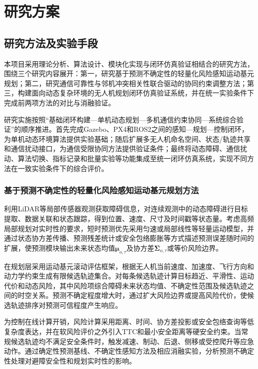 \chapter{研究方案}

\section{研究方法及实验手段}

本项目采用理论分析、算法设计、模块化实现与闭环仿真验证相结合的研究方法，围绕三个研究内容展开：第一，研究基于预测不确定性的轻量化风险感知运动基元规划；第二，研究通信可靠性与邻机冲突相关性联合驱动的协同约束调整方法；第三，构建面向动态复杂环境的无人机规划闭环仿真验证系统，并在统一实验条件下完成前两项方法的对比与消融验证。

研究实施按照“基础闭环构建—单机动态规划—多机通信约束协同—系统综合验证”的顺序推进。首先完成Gazebo、PX4和ROS2之间的感知—规划—控制闭环，为单机动态环境算法提供实验基础；随后扩展多无人机命名空间、状态/轨迹共享和通信扰动接口，为通信受限协同方法提供验证条件；最终将动态障碍、通信扰动、算法切换、指标记录和批量实验等功能集成至统一闭环仿真系统，实现不同方法在一致实验条件下的综合评价。

\subsection{基于预测不确定性的轻量化风险感知运动基元规划方法}

利用LiDAR等局部传感器观测获取障碍信息，对连续观测中的动态障碍进行目标提取、数据关联和状态跟踪，得到位置、速度、尺寸及时间戳等状态量。考虑高频局部规划对实时性的要求，短时预测优先采用匀速或局部线性等轻量运动模型，并通过状态协方差传播、预测残差统计或安全包络膨胀等方式描述预测误差随时间的扩展，使预测模块输出未来状态均值$\boldsymbol{\mu}_{o,\tau}$及协方差$\boldsymbol{\Sigma}_{o,\tau}$或等价风险边界。

在规划层采用运动基元滚动评估框架，根据无人机当前速度、加速度、飞行方向和动力学约束生成有限候选轨迹集合。对每条候选轨迹计算目标趋近、平滑性、运动代价和动态风险，其中风险项综合障碍未来状态均值、不确定性范围及候选轨迹之间的时空关系。预测不确定程度增大时，通过扩大风险边界或提高风险代价，使候选轨迹排序对预测可信程度产生响应。

为控制在线计算开销，风险计算采用距离、时间、协方差投影或安全包络查询等低复杂度表达，并在软风险评价之外引入TTC和最小安全距离等硬安全约束。当常规候选轨迹均不满足安全条件时，触发减速、制动、后退、侧移或受控爬升等应急动作。通过确定性预测基线、不确定性感知方法及相应消融实验，分析预测不确定性处理对避障安全性和规划实时性的影响。

